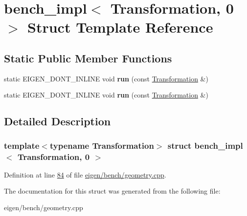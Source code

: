 \hypertarget{structbench__impl_3_01_transformation_00_010_01_4}{}\section{bench\+\_\+impl$<$ Transformation, 0 $>$ Struct Template Reference}
\label{structbench__impl_3_01_transformation_00_010_01_4}
\subsection*{Static Public Member Functions}
\begin{DoxyCompactItemize}
\item 
\mbox{\label{structbench__impl_3_01_transformation_00_010_01_4_abc29f5ba56d2d93aa571ba25be641c62}} 
static E\+I\+G\+E\+N\+\_\+\+D\+O\+N\+T\+\_\+\+I\+N\+L\+I\+NE void {\bfseries run} (const \hyperlink{class_transformation}{Transformation} \&)
\item 
\mbox{\label{structbench__impl_3_01_transformation_00_010_01_4_abc29f5ba56d2d93aa571ba25be641c62}} 
static E\+I\+G\+E\+N\+\_\+\+D\+O\+N\+T\+\_\+\+I\+N\+L\+I\+NE void {\bfseries run} (const \hyperlink{class_transformation}{Transformation} \&)
\end{DoxyCompactItemize}


\subsection{Detailed Description}
\subsubsection*{template$<$typename Transformation$>$\newline
struct bench\+\_\+impl$<$ Transformation, 0 $>$}



Definition at line \hyperlink{eigen_2bench_2geometry_8cpp_source_l00084}{84} of file \hyperlink{eigen_2bench_2geometry_8cpp_source}{eigen/bench/geometry.\+cpp}.



The documentation for this struct was generated from the following file\+:\begin{DoxyCompactItemize}
\item 
eigen/bench/geometry.\+cpp\end{DoxyCompactItemize}
